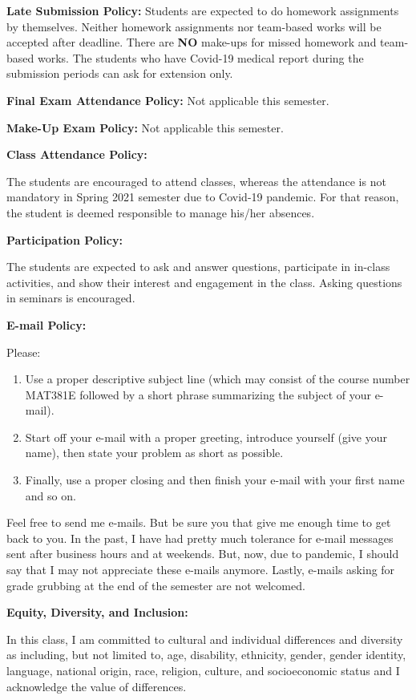 \documentclass[
  12pt,
]{article}
\providecommand{\tightlist}{%
  \setlength{\itemsep}{0pt}\setlength{\parskip}{0pt}}
\begin{document}
\textbf{Late Submission Policy:} Students are expected to do homework
assignments by themselves. Neither homework assignments nor team-based
works will be accepted after deadline. There are \textbf{NO} make-ups
for missed homework and team-based works. The students who have Covid-19
medical report during the submission periods can ask for extension only.

\textbf{Final Exam Attendance Policy:} Not applicable this semester.

\textbf{Make-Up Exam Policy:} Not applicable this semester.

\textbf{Class Attendance Policy:}

The students are encouraged to attend classes, whereas the attendance is
not mandatory in Spring 2021 semester due to Covid-19 pandemic. For that
reason, the student is deemed responsible to manage his/her absences.

\textbf{Participation Policy:}

The students are expected to ask and answer questions, participate in
in-class activities, and show their interest and engagement in the
class. Asking questions in seminars is encouraged.

\textbf{E-mail Policy:}

Please:

\begin{enumerate}
\def\labelenumi{\arabic{enumi}.}
\tightlist
\item
  Use a proper descriptive subject line (which may consist of the course
  number MAT381E followed by a short phrase summarizing the subject of
  your e-mail).
\item
  Start off your e-mail with a proper greeting, introduce yourself (give
  your name), then state your problem as short as possible.
\item
  Finally, use a proper closing and then finish your e-mail with your
  first name and so on.
\end{enumerate}

Feel free to send me e-mails. But be sure you that give me enough time
to get back to you. In the past, I have had pretty much tolerance for
e-mail messages sent after business hours and at weekends. But, now, due
to pandemic, I should say that I may not appreciate these e-mails
anymore. Lastly, e-mails asking for grade grubbing at the end of the
semester are not welcomed.

\textbf{Equity, Diversity, and Inclusion:}

In this class, I am committed to cultural and individual differences and
diversity as including, but not limited to, age, disability, ethnicity,
gender, gender identity, language, national origin, race, religion,
culture, and socioeconomic status and I acknowledge the value of
differences.
\end{document}
